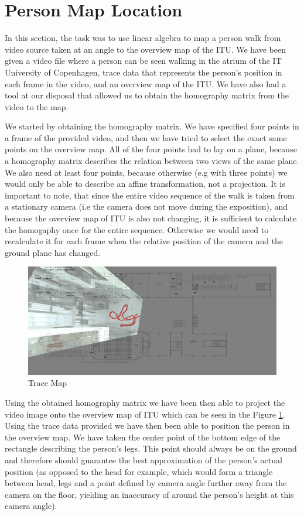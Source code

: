\section{Person Map Location}

In this section, the task was to use linear algebra to map a person walk from video source taken at an angle to the overview map of the ITU. We have been given a video file where a person can be seen walking in the atrium of the IT University of Copenhagen, trace data that represents the person's position in each frame in the video, and an overview map of the ITU. We have also had a tool at our disposal that allowed us to obtain the homography matrix from the video to the map. 

We started by obtaining the homography matrix. We have specified four points in a frame of the provided video, and then we have tried to select the exact same points on the overview map. All of the four points had to lay on a plane, because a homography matrix describes the relation between two views of the same plane. We also need at least four points, because otherwise (e.g with three points) we would only be able to describe an affine transformation, not a projection. It is important to note, that since the entire video sequence of the walk is taken from a stationary camera (i.e the camera does not move during the exposition), and because the overview map of ITU is also not changing, it is sufficient to calculate the homogaphy once for the entire sequence. Otherwise we would need to recalculate it for each frame when the relative position of the camera and the ground plane has changed.

\begin{figure}[h!]
	\centering
	\includegraphics[width=\textwidth]{Handin2/images/trace_map.png}
	\caption{Trace Map}
	\label{fig:trace}
\end{figure}

Using the obtained homography matrix we have been then able to project the video image onto the overview map of ITU which can be seen in the Figure \ref{fig:trace}. Using the trace data provided we have then been able to position the person in the overview map. We have taken the center point of the bottom edge of the rectangle describing the person's legs. This point should always be on the ground and therefore should guarantee the best approximation of the person's actual position (as opposed to the head for example, which would form a triangle between head, legs and a point defined by camera angle further away from the camera on the floor, yielding an inaccuracy of around the person's height at this camera angle).

